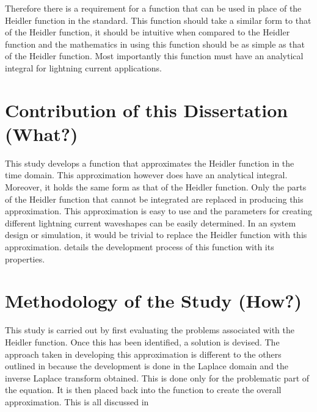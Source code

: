 Therefore there is a requirement for a function that can be used in place of the Heidler function in the standard. This function should take a similar form to that of the Heidler function, it should be intuitive when compared to the Heidler function and the mathematics in using this function should be as simple as that of the Heidler function. Most importantly this function must have an analytical integral for lightning current applications.


\section{Contribution of this Dissertation (What?)}
\label{sec:approach_contribution_of_this_dissertation}
This study develops a function that approximates the Heidler function in the time domain. This approximation however does have an analytical integral. Moreover, it holds the same form as that of the Heidler function. Only the parts of the Heidler function that cannot be integrated are replaced in producing this approximation. This approximation is easy to use and the parameters for creating different lightning current waveshapes can be easily determined. In an system design or simulation, it would be trivial to replace the Heidler function with this approximation.  details the development process of this function with its properties.


\section{Methodology of the Study (How?)}
\label{sec:approach_study_methodology}
This study is carried out by first evaluating the problems associated with the Heidler function. Once this has been identified, a solution is devised. The approach taken in developing this approximation is different to the others outlined in  because the development is done in the Laplace domain and the inverse Laplace transform obtained. This is done only for the problematic part of the equation. It is then placed back into the function to create the overall approximation. This is all discussed in 

